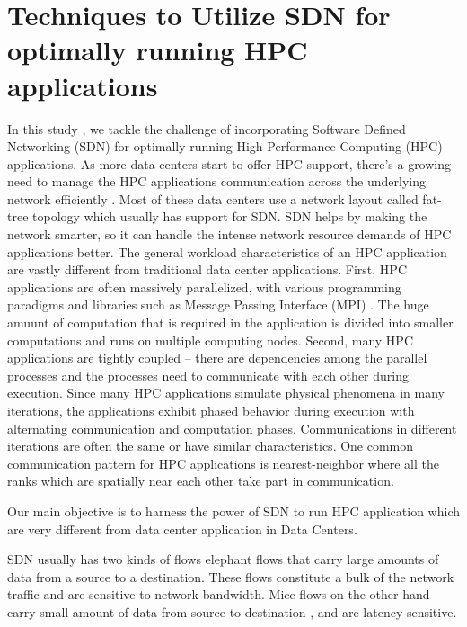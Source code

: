 \chapter{Techniques to Utilize SDN for optimally running HPC applications} In
this study , we tackle the challenge of incorporating Software Defined
Networking (SDN) for optimally running High-Performance Computing (HPC)
applications. As more data centers start to offer HPC support, there's a growing
need to manage the HPC applications communication across the underlying network
efficiently \cite{kreutz2014software, alalmaei2020sdn, he2016firebird,}. 
Most of
these data centers use a network layout called fat-tree topology which usually
has support for SDN. SDN helps by making the network smarter, so it can handle
the intense network resource demands of HPC applications better. The general
workload characteristics of an HPC application are vastly different from
traditional data center applications. First, HPC applications are often
massively parallelized, with various programming paradigms and libraries such as
Message Passing Interface (MPI) \cite{forum1994mpi}. The huge amuunt of computation that is
required in the application is divided into smaller computations and runs on
multiple computing nodes. Second, many HPC applications are tightly coupled –
there are dependencies among the parallel processes and the processes need to
communicate with each other during execution. Since many HPC applications
simulate physical phenomena in many iterations, the applications exhibit phased
behavior during execution with alternating communication and computation phases.
Communications in different iterations are often the same or have similar
characteristics. One common communication pattern for HPC applications is
nearest-neighbor where all the ranks which are spatially near each other take
part in communication. 

Our main objective is to harness the power of SDN to run HPC application which are 
very different from data center application in Data Centers.

 SDN usually has two kinds of flows elephant flows that
carry large amounts of data from a source to a destination. These flows
constitute a bulk of the network traffic and are sensitive to network bandwidth.
Mice flows on the other hand carry small amount of data from source to
destination \cite{yang2020flow, afek2015sampling}, and are latency sensitive.

